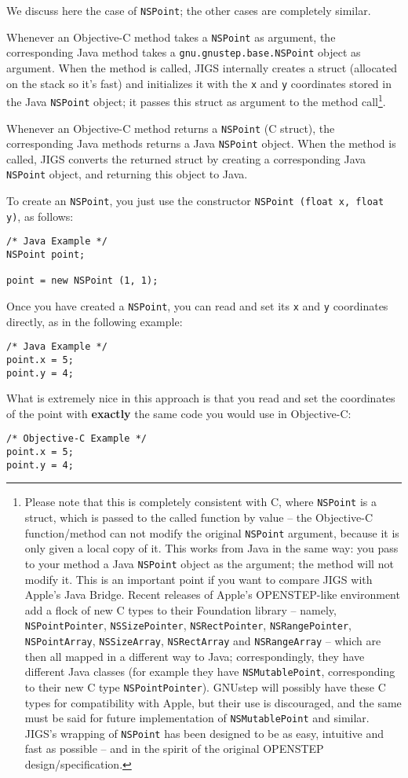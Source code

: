 We discuss here the case of \texttt{NSPoint}; the other cases are
completely similar.

Whenever an Objective-C method takes a \texttt{NSPoint} as argument,
the corresponding Java method takes a
\texttt{gnu.gnustep.base.NSPoint} object as argument.  When the method 
is called, JIGS internally creates a struct (allocated on the stack so
it's fast) and initializes it with the \texttt{x} and \texttt{y}
coordinates stored in the Java \texttt{NSPoint} object; it passes this
struct as argument to the method call\footnote{Please note that this
is completely consistent with C, where \texttt{NSPoint} is a struct,
which is passed to the called function by value -- the Objective-C
function/method can not modify the original
\texttt{NSPoint} argument, because it is only given a local copy of
it.  This works from Java in the same way: you pass to your method a
Java \texttt{NSPoint} object as the argument; the method will not
modify it.  This is an important point if you want to compare JIGS
with Apple's Java Bridge.  Recent releases of Apple's OPENSTEP-like
environment add a flock of new C types to their Foundation library --
namely, \texttt{NSPointPointer}, \texttt{NSSizePointer},
\texttt{NSRectPointer}, \texttt{NSRangePointer}, \texttt{NSPointArray}, 
\texttt{NSSizeArray}, \texttt{NSRectArray} and \texttt{NSRangeArray}  
-- which are then all mapped in a different way to Java;
correspondingly, they have different Java classes (for example they
have \texttt{NSMutablePoint}, corresponding to their new C type
\texttt{NSPointPointer}).  GNUstep will possibly have these C types 
for compatibility with Apple, but their use is discouraged, and the
same must be said for future implementation of \texttt{NSMutablePoint}
and similar.  JIGS's wrapping of \texttt{NSPoint} has been designed to
be as easy, intuitive and fast as possible -- and in the spirit of the
original OPENSTEP design/specification.}.

Whenever an Objective-C method returns a \texttt{NSPoint} (C struct),
the corresponding Java methods returns a Java \texttt{NSPoint} object.
When the method is called, JIGS converts the returned struct by
creating a corresponding Java \texttt{NSPoint} object, and returning
this object to Java.

To create an \texttt{NSPoint}, you just use the constructor
\texttt{NSPoint (float x, float y)}, as follows:
\begin{verbatim}
/* Java Example */
NSPoint point;

point = new NSPoint (1, 1);
\end{verbatim}
Once you have created a \texttt{NSPoint}, you can read and set its
\texttt{x} and \texttt{y} coordinates directly, as in the following
example:
\begin{verbatim}
/* Java Example */
point.x = 5;
point.y = 4;
\end{verbatim}
What is extremely nice in this approach is that you read and set the
coordinates of the point with {\bf exactly} the same code you would
use in Objective-C:
\begin{verbatim}
/* Objective-C Example */
point.x = 5;
point.y = 4;
\end{verbatim}

